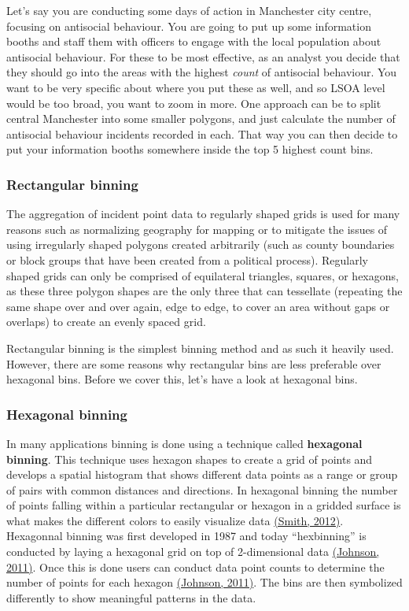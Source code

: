 \documentclass[
]{book}
\begin{document}
Let's say you are conducting some days of action in Manchester city centre, focusing on antisocial behaviour. You are going to put up some information booths and staff them with officers to engage with the local population about antisocial behaviour. For these to be most effective, as an analyst you decide that they should go into the areas with the highest \emph{count} of antisocial behaviour. You want to be very specific about where you put these as well, and so LSOA level would be too broad, you want to zoom in more. One approach can be to split central Manchester into some smaller polygons, and just calculate the number of antisocial behaviour incidents recorded in each. That way you can then decide to put your information booths somewhere inside the top 5 highest count bins.

\hypertarget{rectangular-binning}{%
\subsubsection{Rectangular binning}\label{rectangular-binning}}

The aggregation of incident point data to regularly shaped grids is used for many reasons such as normalizing geography for mapping or to mitigate the issues of using irregularly shaped polygons created arbitrarily (such as county boundaries or block groups that have been created from a political process). Regularly shaped grids can only be comprised of equilateral triangles, squares, or hexagons, as these three polygon shapes are the only three that can tessellate (repeating the same shape over and over again, edge to edge, to cover an area without gaps or overlaps) to create an evenly spaced grid.

Rectangular binning is the simplest binning method and as such it heavily used. However, there are some reasons why rectangular bins are less preferable over hexagonal bins. Before we cover this, let's have a look at hexagonal bins.

\hypertarget{hexagonal-binning}{%
\subsubsection{Hexagonal binning}\label{hexagonal-binning}}

In many applications binning is done using a technique called \textbf{hexagonal binning}. This technique uses hexagon shapes to create a grid of points and develops a spatial histogram that shows different data points as a range or group of pairs with common distances and directions. In hexagonal binning the number of points falling within a particular rectangular or hexagon in a gridded surface is what makes the different colors to easily visualize data \href{https://www.mapbox.com/blog/binning-alternative-point-maps/}{(Smith, 2012)}. Hexagonnal binning was first developed in 1987 and today ``hexbinning'' is conducted by laying a hexagonal grid on top of 2-dimensional data \href{http://indiemaps.com/blog/2011/10/hexbins/}{(Johnson, 2011)}. Once this is done users can conduct data point counts to determine the number of points for each hexagon \href{http://indiemaps.com/blog/2011/10/hexbins/}{(Johnson, 2011)}. The bins are then symbolized differently to show meaningful patterns in the data.
\end{document}
